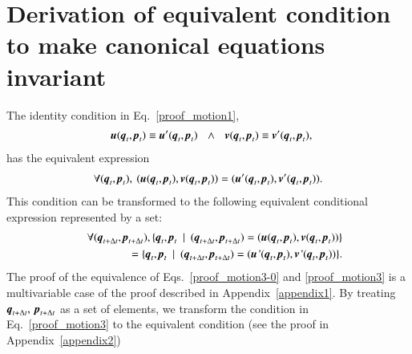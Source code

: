 \documentclass[preprint,
bibnotes,
 amsmath,amssymb,
 aps,
]{revtex4-1}
\newcounter{num}
\begin{document}
\section{Derivation of equivalent condition to make canonical equations invariant}
\label{appendix_b}

The identity condition in Eq.~\eqref{proof_motion1},
\begin{eqnarray}
&\:&\textit{\textbf{u}}(\textit{\textbf{q}}_{t},\textit{\textbf{p}}_{t}) \equiv  \textit{\textbf{u}}'(\textit{\textbf{q}}_{t},\textit{\textbf{p}}_{t}) \:\:\:\land\:\:\: 
 \textit{\textbf{v}}(\textit{\textbf{q}}_{t},\textit{\textbf{p}}_{t}) \equiv 
 \textit{\textbf{v}}'(\textit{\textbf{q}}_{t},\textit{\textbf{p}}_{t}),\:\:\:
\end{eqnarray}
has the equivalent expression
\begin{eqnarray}
\forall{(\textit{\textbf{q}}_{t},\textit{\textbf{p}}_{t})},  \:(\textit{\textbf{u}}(\textit{\textbf{q}}_{t},\textit{\textbf{p}}_{t}), \textit{\textbf{v}}(\textit{\textbf{q}}_{t},\textit{\textbf{p}}_{t})) =  (\textit{\textbf{u}}'(\textit{\textbf{q}}_{t},\textit{\textbf{p}}_{t}),\textit{\textbf{v}}'(\textit{\textbf{q}}_{t},\textit{\textbf{p}}_{t})).\label{proof_motion3-0}
\end{eqnarray}
This condition can be transformed to the following equivalent conditional expression represented by a set:
\begin{eqnarray}
&\:&\forall{(\textit{\textbf{q}}_{t+\Delta t},\textit{\textbf{p}}_{t+\Delta t})}, \{\textit{\textbf{q}}_{t},\textit{\textbf{p}}_{t}\:\mid \: (\textit{\textbf{q}}_{t+\Delta t},\textit{\textbf{p}}_{t+\Delta t}) = (\textit{\textbf{u}}(\textit{\textbf{q}}_{t},\textit{\textbf{p}}_{t}),\textit{\textbf{v}}(\textit{\textbf{q}}_{t},\textit{\textbf{p}}_{t}))\}\nonumber\\
&\:&\:=\{\textit{\textbf{q}}_{t},\textit{\textbf{p}}_{t}\:\mid \: (\textit{\textbf{q}}_{t+\Delta t},\textit{\textbf{p}}_{t+\Delta t}) = (\textit{\textbf{u}'}(\textit{\textbf{q}}_{t},\textit{\textbf{p}}_{t}),\textit{\textbf{v}'}(\textit{\textbf{q}}_{t},\textit{\textbf{p}}_{t}))\}.\label{proof_motion3}
\end{eqnarray}
The proof of the equivalence of Eqs.~\eqref{proof_motion3-0} and \eqref{proof_motion3} is a multivariable case of the proof described in Appendix~\ref{appendix1}. 
By treating $\textit{\textbf{q}}_{t+\Delta t},\:\textit{\textbf{p}}_{t+\Delta t}$ as a set of elements, we transform the condition in Eq.~\eqref{proof_motion3} to the equivalent condition (see the proof in Appendix~\ref{appendix2})
\end{document}
